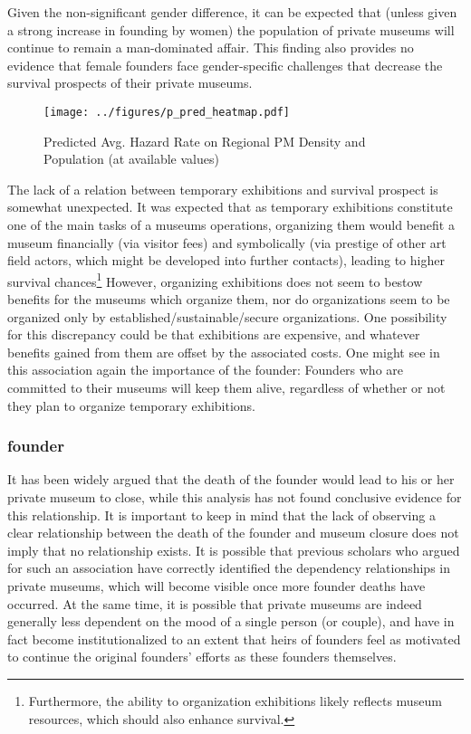 \documentclass[12pt]{article}
\begin{document}
Given the non-significant gender difference, it can be expected that (unless given a strong increase in founding by women) the population of private museums will continue to remain a man-dominated affair.
This finding also provides no evidence that female founders face gender-specific challenges that decrease the survival prospects of their private museums. 





\begin{figure}[htbp]
\centering
\texttt{[image: ../figures/p\_pred\_heatmap.pdf]}
\caption{\label{fig:p_pred_heatmap}Predicted Avg. Hazard Rate on Regional PM Density and Population (at available values)}
\end{figure}


The lack of a relation between temporary exhibitions and survival prospect is somewhat unexpected.
It was expected that as temporary exhibitions constitute one of the main tasks of a museums operations, organizing them would benefit a museum financially (via visitor fees) and symbolically (via prestige of other art field actors, which might be developed into further contacts), leading to higher survival chances\footnote{Furthermore, the ability to organization exhibitions likely reflects museum resources, which should also enhance survival.}
However, organizing exhibitions does not seem to bestow benefits for the museums which organize them, nor do organizations seem to be organized only by established/sustainable/secure organizations.
One possibility for this discrepancy could be that exhibitions are expensive, and whatever benefits gained from them are offset by the associated costs.
One might see in this association again the importance of the founder:
Founders who are committed to their museums will keep them alive, regardless of whether or not they plan to organize temporary exhibitions.
\subsubsection*{founder}

It has been widely argued that the death of the founder would lead to his or her private museum to close, while this analysis has not found conclusive evidence for this relationship.
It is important to keep in mind that the lack of observing a clear relationship between the death of the founder and museum closure does not imply that no relationship exists.
It is possible that previous scholars who argued for such an association have correctly identified the dependency relationships in private museums, which will become visible once more founder deaths have occurred.
At the same time, it is possible that private museums are indeed generally less dependent on the mood of a single person (or couple), and have in fact become institutionalized to an extent that heirs of founders feel as motivated to continue the original founders' efforts as these founders themselves.
\end{document}
